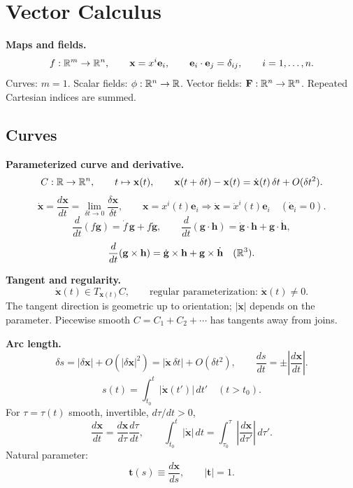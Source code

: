 \section{Vector Calculus}
\label{sec:vector-calculus}

\noindent\textbf{Maps and fields.}\quad
\[
f:\mathbb{R}^m\to\mathbb{R}^n,\qquad
\mathbf{x}=x^i\mathbf{e}_i,\qquad
\mathbf{e}_i\cdot\mathbf{e}_j=\delta_{ij},
\qquad i=1,\ldots,n.
\]
Curves: $m=1$. Scalar fields: $\phi:\mathbb{R}^n\to\mathbb{R}$. Vector fields:
$\mathbf{F}:\mathbb{R}^n\to\mathbb{R}^n$. Repeated Cartesian indices are summed.

\subsection{Curves}

\noindent\textbf{Parameterized curve and derivative.}
\[
C:\mathbb{R}\to\mathbb{R}^n,\qquad t\mapsto \mathbf{x}(t),\qquad
\mathbf{x}(t+\delta t)-\mathbf{x}(t)
=\dot{\mathbf{x}}(t)\,\delta t+O(\delta t^2).
\]
\[
\dot{\mathbf{x}}=\frac{d\mathbf{x}}{dt}
=\lim_{\delta t\to0}\frac{\delta\mathbf{x}}{\delta t},
\qquad
\mathbf{x}=x^i(t)\mathbf{e}_i\Rightarrow
\dot{\mathbf{x}}=\dot{x}^i(t)\mathbf{e}_i
\quad(\dot{\mathbf{e}}_i=0).
\]
\[
\frac{d}{dt}(f\mathbf{g})=\dot f\,\mathbf{g}+f\dot{\mathbf{g}},
\qquad
\frac{d}{dt}(\mathbf{g}\cdot\mathbf{h})
=\dot{\mathbf{g}}\cdot\mathbf{h}+\mathbf{g}\cdot\dot{\mathbf{h}},
\]
\[
\frac{d}{dt}(\mathbf{g}\times\mathbf{h})
=\dot{\mathbf{g}}\times\mathbf{h}+\mathbf{g}\times\dot{\mathbf{h}}
\quad(\mathbb{R}^3).
\]

\noindent\textbf{Tangent and regularity.}
\[
\dot{\mathbf{x}}(t)\in T_{\mathbf{x}(t)}C,\qquad
\text{regular parameterization: }\dot{\mathbf{x}}(t)\ne0.
\]
The tangent direction is geometric up to orientation; $|\dot{\mathbf{x}}|$ depends on
the parameter. Piecewise smooth $C=C_1+C_2+\cdots$ has tangents away from joins.

\noindent\textbf{Arc length.}
\[
\delta s=|\delta\mathbf{x}|+O(|\delta\mathbf{x}|^2)
=|\dot{\mathbf{x}}\,\delta t|+O(\delta t^2),
\qquad
\frac{ds}{dt}=\pm\left|\frac{d\mathbf{x}}{dt}\right|.
\]
\[
s(t)=\int_{t_0}^{t}|\dot{\mathbf{x}}(t')|\,dt'
\quad(t>t_0).
\]
For $\tau=\tau(t)$ smooth, invertible, $d\tau/dt>0$,
\[
\frac{d\mathbf{x}}{dt}
=\frac{d\mathbf{x}}{d\tau}\frac{d\tau}{dt},
\qquad
\int_{t_0}^{t}|\dot{\mathbf{x}}|\,dt
=\int_{\tau_0}^{\tau}\left|\frac{d\mathbf{x}}{d\tau'}\right|\,d\tau'.
\]
Natural parameter:
\[
\mathbf{t}(s)\equiv\frac{d\mathbf{x}}{ds},\qquad |\mathbf{t}|=1.
\]

